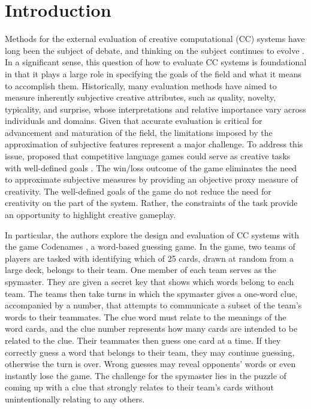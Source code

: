 \documentclass[phd,electronic,oneside,twosidetoc,letterpaper,chaptercenter,parttop,lof]{byumsphd}
\begin{document}
\section{Introduction}

Methods for the external evaluation of creative computational (CC) systems have long been the subject of debate, and thinking on the subject continues to evolve \cite{ritchie07,pease2011face,jordanous2012standardised,bown2014,lamb2015,ventura2016mere,carnovalini2021,peeperkorn2023}.
In a significant sense, this question of how to evaluate CC systems is foundational in that it plays a large role in specifying the goals of the field and what it means to accomplish them.  Historically, many evaluation methods have aimed to measure inherently subjective creative attributes, such as quality, novelty, typicality, and surprise, whose interpretations and relative importance vary across individuals and domains. Given that accurate evaluation is critical for advancement and maturation of the field, the limitations imposed by the approximation of subjective features represent a major challenge.  To address this issue, \citeauthor{spendlove2022competitive} proposed that competitive language games could serve as creative tasks with well-defined goals \cite{spendlove2022competitive}. The win/loss outcome of the game eliminates the need to approximate subjective measures by providing an objective proxy measure of creativity. The well-defined goals of the game do not reduce the need for creativity on the part of the system. Rather, the constraints of the task provide an opportunity to highlight creative gameplay.

In particular, the authors explore the design and evaluation of CC systems with the game Codenames \cite{codenames2015}, a word-based guessing game. In the game, two teams of players are tasked with identifying which of 25 cards, drawn at random from a large deck, belongs to their team. One member of each team serves as the spymaster. They are given a secret key that shows which words belong to each team.  The teams then take turns in which the spymaster gives a one-word clue, accompanied by a number, that attempts to communicate a subset of the team's words to their teammates. The clue word must relate to the meanings of the word cards, and the clue number represents how many cards are intended to be related to the clue. Their teammates then guess one card at a time. If they correctly guess a word that belongs to their team, they may continue guessing, otherwise the turn is over. Wrong guesses may reveal opponents’ words or even instantly lose the game. The challenge for the spymaster lies in the puzzle of coming up with a clue that strongly relates to their team's cards without unintentionally relating to any others.
\end{document}
